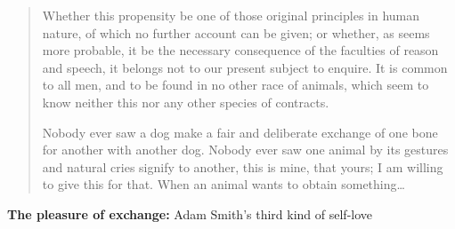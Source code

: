             \begin{quote}
                Whether this propensity be one of those original principles in human nature, of which no further account can be given; or whether, as seems more probable, it be the necessary consequence of the faculties of reason and speech, it belongs not to our present subject to enquire. It is common to all men, and to be found in no other race of animals, which seem to know neither this nor any other species of contracts.
                
                Nobody ever saw a dog make a fair and deliberate exchange of one bone for another with another dog. Nobody ever saw one animal by its gestures and natural cries signify to another, this is mine, that yours; I am willing to give this for that. When an animal wants to obtain something…
            \end{quote}

            \begin{proposition}
                \textbf{The pleasure of exchange:} Adam Smith’s third kind of self-love
            \end{proposition}
